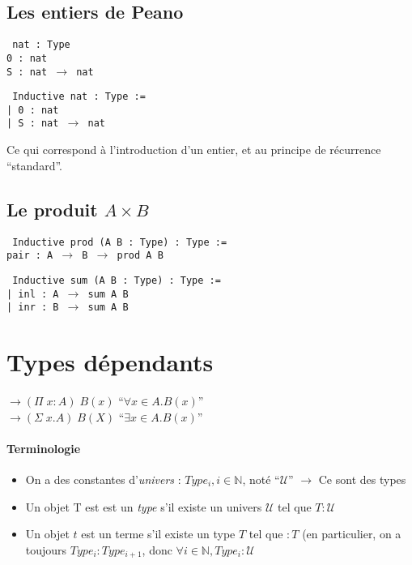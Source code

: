 \documentclass{article}
\begin{document}
\subsection{Les entiers de Peano}
\texttt{
nat : Type\\
0 : nat\\
S : nat $\to$ nat
}
\bigskip

\texttt{
Inductive nat : Type :=\\
| 0 : nat\\
| S : nat $\to$ nat}
\bigskip

Ce qui correspond à l'introduction d'un entier, et au principe de récurrence ``standard''.




\subsection{Le produit $A\times B$}
\texttt{
Inductive prod (A B : Type) : Type :=\\
pair : A $\to$ B $\to$ prod A B\\
}
\bigskip

\texttt{
Inductive sum (A B : Type) : Type :=\\
| inl : A $\to$ sum A B\\
| inr : B $\to$ sum A B
}

\section{Types dépendants}
$\to (\Pi\; x : A)\; B(x)$ ``$\forall x\in A. B(x)$''\\
$ \to (\Sigma \; x.A)\; B(X)$ ``$\exists x\in A . B(x)$''


\paragraph{Terminologie}
\begin{itemize}[label=-]
\item On a des constantes d'\emph{univers} : $Type_i, i\in \mathbb{N}$, noté ``$\mathcal{U}$'' $\to$ Ce sont des types

\item Un objet T est est un \emph{type} s'il existe un univers $\mathcal{U}$ tel que $T : \mathcal{U}$

\item Un objet $t$ est un terme s'il existe un type $T$ tel que $:T$ (en particulier, on a toujours $Type_i : Type_{i+1}$, donc $\forall i \in \mathbb{N}, Type_i : \mathcal{U}$
\end{itemize}
\end{document}
